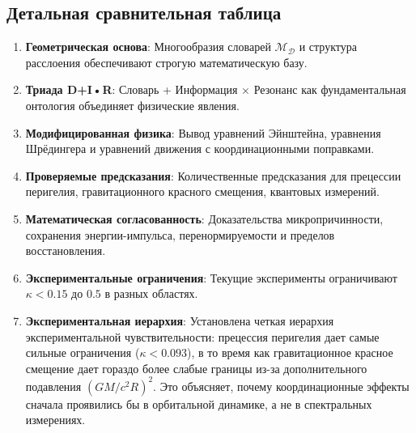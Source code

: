 \documentclass[11pt,a4paper]{article}
\begin{document}
	\subsection{Детальная сравнительная таблица}
	\begin{enumerate}
		\item \textbf{Геометрическая основа}: Многообразия словарей $\mathcal{M}_{\mathcal{D}}$ и структура расслоения обеспечивают строгую математическую базу.
		
		\item \textbf{Триада D+I•R}: Словарь + Информация × Резонанс как фундаментальная онтология объединяет физические явления.
		
		\item \textbf{Модифицированная физика}: Вывод уравнений Эйнштейна, уравнения Шрёдингера и уравнений движения с координационными поправками.
		
		\item \textbf{Проверяемые предсказания}: Количественные предсказания для прецессии перигелия, гравитационного красного смещения, квантовых измерений.
		
		\item \textbf{Математическая согласованность}: Доказательства микропричинности, сохранения энергии-импульса, перенормируемости и пределов восстановления.
		
		\item \textbf{Экспериментальные ограничения}: Текущие эксперименты ограничивают $\kappa < 0.15$ до $0.5$ в разных областях.
		
		\item \textbf{Экспериментальная иерархия}: Установлена четкая иерархия экспериментальной чувствительности: прецессия перигелия дает самые сильные ограничения ($\kappa < 0.093$), в то время как гравитационное красное смещение дает гораздо более слабые границы из-за дополнительного подавления $(GM/c^2R)^2$. Это объясняет, почему координационные эффекты сначала проявились бы в орбитальной динамике, а не в спектральных измерениях.
	\end{enumerate}
\end{document}
